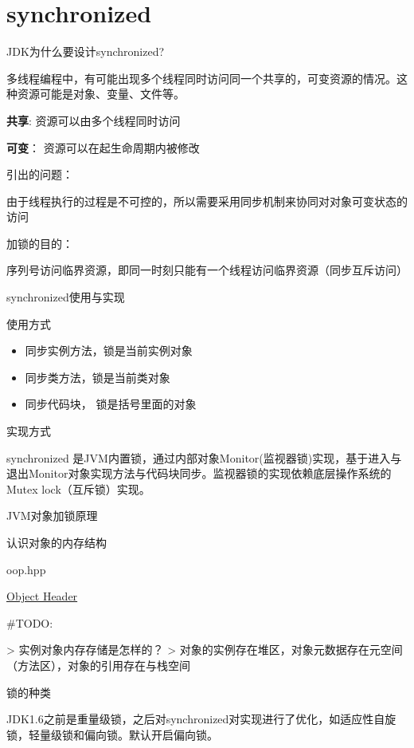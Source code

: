 \section{synchronized}
\label{chap:synchronized}

JDK为什么要设计synchronized?

多线程编程中，有可能出现多个线程同时访问同一个共享的，可变资源的情况。这种资源可能是对象、变量、文件等。

\textbf{共享}:  资源可以由多个线程同时访问

\textbf{可变}： 资源可以在起生命周期内被修改

引出的问题：

由于线程执行的过程是不可控的，所以需要采用同步机制来协同对对象可变状态的访问


加锁的目的：

序列号访问临界资源，即同一时刻只能有一个线程访问临界资源（同步互斥访问）



synchronized使用与实现

使用方式

\begin{itemize}
    \item 同步实例方法，锁是当前实例对象
    \item 同步类方法，锁是当前类对象
    \item 同步代码块， 锁是括号里面的对象
\end{itemize}


实现方式

synchronized 是JVM内置锁，通过内部对象Monitor(监视器锁)实现，基于进入与退出Monitor对象实现方法与代码块同步。监视器锁的实现依赖底层操作系统的Mutex lock（互斥锁）实现。

JVM对象加锁原理

认识对象的内存结构

oop.hpp

\href{https://gist.github.com/arturmkrtchyan/43d6135e8a15798cc46c}{Object Header}


#TODO:


> 实例对象内存存储是怎样的？
> 对象的实例存在堆区，对象元数据存在元空间（方法区），对象的引用存在与栈空间


锁的种类


JDK1.6之前是重量级锁，之后对synchronized对实现进行了优化，如适应性自旋锁，轻量级锁和偏向锁。默认开启偏向锁。


